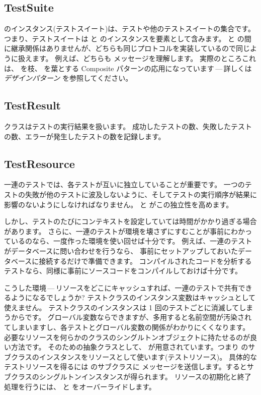 \documentclass[a4paper,10pt,twoside]{book}
\begin{document}
\subsection{TestSuite}

 のインスタンス(テストスイート)は、テストや他のテストスイートの集合です。
つまり、テストスイートは  と  のインスタンスを要素として含みます。
 と  の間に継承関係はありませんが、どちらも同じプロトコルを実装しているので同じように扱えます。
例えば、どちらも  メッセージを理解します。
実際のところこれは、 を枝、 を葉とする Composite パターンの応用になっています\,---\,詳しくは \textit{デザインパターン} を参照してください\cite{Gamm95a}。
\subsection{TestResult}

 クラスはテストの実行結果を扱います。%
成功したテストの数、失敗したテストの数、エラーが発生したテストの数を記録します。

\subsection{TestResource}

一連のテストでは、各テストが互いに独立していることが重要です。
一つのテストの失敗が他のテストに波及しないように、そしてテストの実行順序が結果に影響のないようにしなければなりません。
 と  がこの独立性を高めます。

しかし、テストのたびにコンテキストを設定していては時間がかかり過ぎる場合があります。
さらに、一連のテストが環境を壊さずにすむことが事前にわかっているのなら、一度作った環境を使い回せば十分です。
例えば、一連のテストがデータベースに問い合わせを行うなら、
事前にセットアップしておいたデータベースに接続するだけで準備できます。
コンパイルされたコードを分析するテストなら、同様に事前にソースコードをコンパイルしておけば十分です。

こうした環境\,---\,リソースをどこにキャッシュすれば、一連のテストで共有できるようになるでしょうか?
テストクラスのインスタンス変数はキャッシュとして使えません。
テストクラスのインスタンスは 1 回のテストごとに消滅してしまうからです。
グローバル変数ならできますが、多用すると名前空間が汚染されてしまいますし、各テストとグローバル変数の関係がわかりにくくなります。
必要なリソースを何らかのクラスのシングルトンオブジェクトに持たせるのが良い方法です。
そのための抽象クラスとして、 が用意されています。つまり  のサブクラスのインスタンスをリソースとして使います(テストリソース)。
具体的なテストリソースを得るには  のサブクラスに  メッセージを送信します。するとサブクラスのシングルトンインスタンスが得られます。
リソースの初期化と終了処理を行うには、 と  をオーバーライドします。
\end{document}
